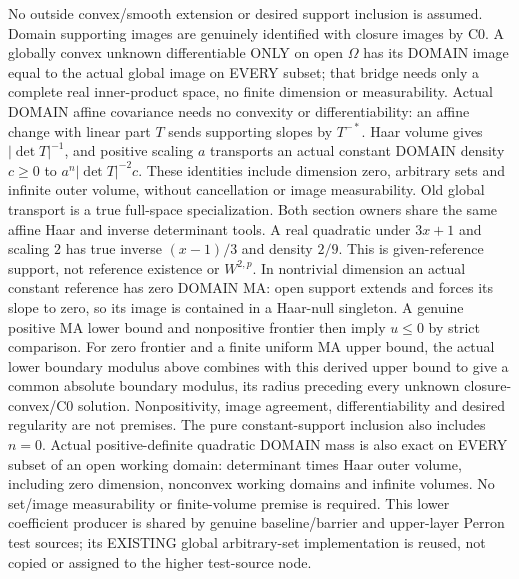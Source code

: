 \begin{lemma}
  No outside convex/smooth extension or desired support inclusion is assumed.
  Domain supporting images are genuinely identified with closure images by C0.
  A globally convex unknown differentiable ONLY on open $\Omega$ has its DOMAIN
  image equal to the actual global image on EVERY subset; that bridge needs only
  a complete real inner-product space, no finite dimension or measurability.
  Actual DOMAIN affine covariance needs no convexity or differentiability:
  an affine change with linear part $T$ sends supporting slopes by $T^{-*}$.
  Haar volume gives $|\det T|^{-1}$, and positive scaling $a$ transports an
  actual constant DOMAIN density $c\ge0$ to $a^n|\det T|^{-2}c$.
  These identities include dimension zero, arbitrary sets and infinite outer
  volume, without cancellation or image measurability. Old global transport
  is a true full-space specialization. Both section owners share the same
  affine Haar and inverse determinant tools. A real quadratic under $3x+1$
  and scaling $2$ has true inverse $(x-1)/3$ and density $2/9$.
  This is given-reference support, not reference existence or $W^{2,p}$.
  In nontrivial dimension an actual constant reference has zero DOMAIN MA:
  open support extends and forces its slope to zero, so its image is contained
  in a Haar-null singleton. A genuine positive MA lower bound and nonpositive
  frontier then imply $u\le0$ by strict comparison. For zero frontier and a
  finite uniform MA upper bound, the actual lower boundary modulus above
  combines with this derived upper bound to give a common absolute boundary
  modulus, its radius preceding every unknown closure-convex/C0 solution.
  Nonpositivity, image agreement, differentiability and desired regularity
  are not premises. The pure constant-support inclusion also includes $n=0$.
  Actual positive-definite quadratic DOMAIN mass is also exact on EVERY
  subset of an open working domain: determinant times Haar outer volume,
  including zero dimension, nonconvex working domains and infinite volumes.
  No set/image measurability or finite-volume premise is required. This lower
  coefficient producer is shared by genuine baseline/barrier and upper-layer
  Perron test sources; its EXISTING global arbitrary-set implementation is
  reused, not copied or assigned to the higher test-source node.
\end{lemma}

